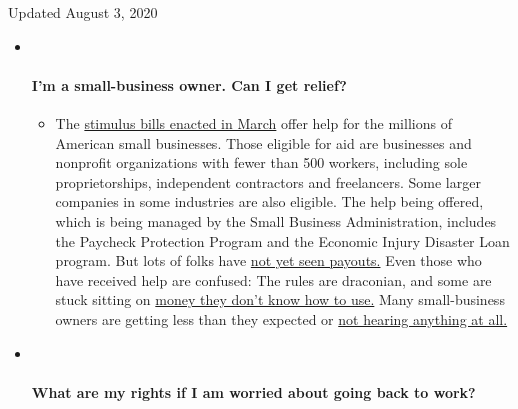 Updated August 3, 2020

\begin{itemize}
\item ~
  \hypertarget{im-a-small-business-owner-can-i-get-relief}{%
  \paragraph{I'm a small-business owner. Can I get
  relief?}\label{im-a-small-business-owner-can-i-get-relief}}

  \begin{itemize}
  \tightlist
  \item
    The
    \href{https://www.nytimes.com/article/small-business-loans-stimulus-grants-freelancers-coronavirus.html?action=click\&pgtype=Article\&state=default\&region=MAIN_CONTENT_3\&context=storylines_faq}{stimulus
    bills enacted in March} offer help for the millions of American
    small businesses. Those eligible for aid are businesses and
    nonprofit organizations with fewer than 500 workers, including sole
    proprietorships, independent contractors and freelancers. Some
    larger companies in some industries are also eligible. The help
    being offered, which is being managed by the Small Business
    Administration, includes the Paycheck Protection Program and the
    Economic Injury Disaster Loan program. But lots of folks have
    \href{https://www.nytimes.com/interactive/2020/05/07/business/small-business-loans-coronavirus.html?action=click\&pgtype=Article\&state=default\&region=MAIN_CONTENT_3\&context=storylines_faq}{not
    yet seen payouts.} Even those who have received help are confused:
    The rules are draconian, and some are stuck sitting on
    \href{https://www.nytimes.com/2020/05/02/business/economy/loans-coronavirus-small-business.html?action=click\&pgtype=Article\&state=default\&region=MAIN_CONTENT_3\&context=storylines_faq}{money
    they don't know how to use.} Many small-business owners are getting
    less than they expected or
    \href{https://www.nytimes.com/2020/06/10/business/Small-business-loans-ppp.html?action=click\&pgtype=Article\&state=default\&region=MAIN_CONTENT_3\&context=storylines_faq}{not
    hearing anything at all.}
  \end{itemize}
\item ~
  \hypertarget{what-are-my-rights-if-i-am-worried-about-going-back-to-work}{%
  \paragraph{What are my rights if I am worried about going back to
  work?}\label{what-are-my-rights-if-i-am-worried-about-going-back-to-work}}


\end{itemize}
